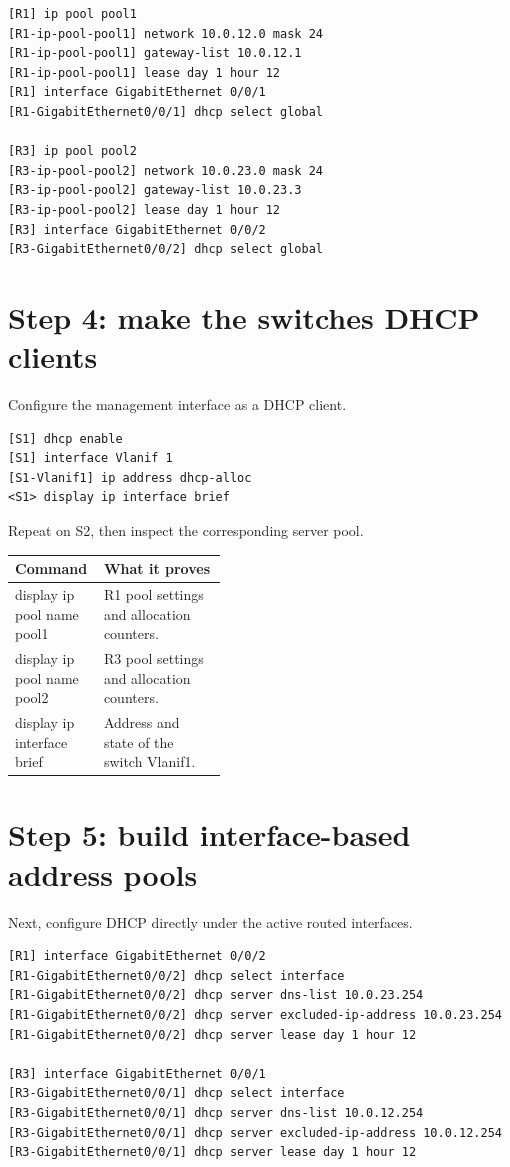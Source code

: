 \begin{lstlisting}[style=dcnterminal]
[R1] ip pool pool1
[R1-ip-pool-pool1] network 10.0.12.0 mask 24
[R1-ip-pool-pool1] gateway-list 10.0.12.1
[R1-ip-pool-pool1] lease day 1 hour 12
[R1] interface GigabitEthernet 0/0/1
[R1-GigabitEthernet0/0/1] dhcp select global

[R3] ip pool pool2
[R3-ip-pool-pool2] network 10.0.23.0 mask 24
[R3-ip-pool-pool2] gateway-list 10.0.23.3
[R3-ip-pool-pool2] lease day 1 hour 12
[R3] interface GigabitEthernet 0/0/2
[R3-GigabitEthernet0/0/2] dhcp select global
\end{lstlisting}

\section{Step 4: make the switches DHCP clients}
Configure the management interface as a DHCP client.
\begin{lstlisting}[style=dcnterminal]
[S1] dhcp enable
[S1] interface Vlanif 1
[S1-Vlanif1] ip address dhcp-alloc
<S1> display ip interface brief
\end{lstlisting}
Repeat on S2, then inspect the corresponding server pool.

\begin{commandmap}
\begin{tabularx}{\linewidth}{>{\ttfamily}p{0.42\linewidth}X}
\toprule
Command & What it proves\\\midrule
 display ip pool name pool1 & R1 pool settings and allocation counters.\\
 display ip pool name pool2 & R3 pool settings and allocation counters.\\
 display ip interface brief & Address and state of the switch Vlanif1.\\\bottomrule
\end{tabularx}
\end{commandmap}

\section{Step 5: build interface-based address pools}
Next, configure DHCP directly under the active routed interfaces.
\begin{lstlisting}[style=dcnterminal]
[R1] interface GigabitEthernet 0/0/2
[R1-GigabitEthernet0/0/2] dhcp select interface
[R1-GigabitEthernet0/0/2] dhcp server dns-list 10.0.23.254
[R1-GigabitEthernet0/0/2] dhcp server excluded-ip-address 10.0.23.254
[R1-GigabitEthernet0/0/2] dhcp server lease day 1 hour 12

[R3] interface GigabitEthernet 0/0/1
[R3-GigabitEthernet0/0/1] dhcp select interface
[R3-GigabitEthernet0/0/1] dhcp server dns-list 10.0.12.254
[R3-GigabitEthernet0/0/1] dhcp server excluded-ip-address 10.0.12.254
[R3-GigabitEthernet0/0/1] dhcp server lease day 1 hour 12
\end{lstlisting}


